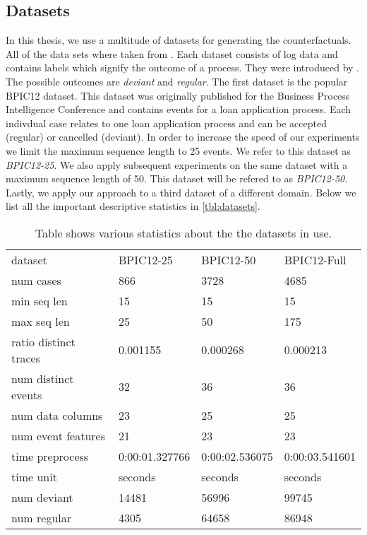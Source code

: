 \documentclass[./../../paper.tex]{subfiles}
\begin{document}
\subsection{Datasets}
\label{sec:dataset_description}
In this thesis, we use a multitude of datasets for generating the counterfactuals. All of the data sets where taken from \citeauthor{teinemaa_OutcomeOrientedPredictiveProcess_2018a}. Each dataset consists of log data and contains labels which signify the outcome of a process. They were introduced by . The possible outcomes are \emph{deviant} and \emph{regular}. The first dataset is the popular BPIC12 dataset. This dataset was originally published for the Business Process Intelligence Conference and contains events for a loan application process. Each indivdual case relates to one loan application process and can be accepted (regular) or cancelled (deviant). In order to increase the speed of our experiments we limit the maximum sequence length to 25 events. We refer to this dataset as \emph{BPIC12-25}. We also apply subsequent experiments on the same dataset with a maximum sequence length of 50. This dataset will be refered to as \emph{BPIC12-50}. Lastly, we apply our approach to a third dataset of a different domain. Below we list all the important descriptive statistics in \autoref{tbl:datasets}.  

\begin{table}[htb]
    \centering
    \begin{tabular}{llll}
        dataset & BPIC12-25 & BPIC12-50 & BPIC12-Full \\
        num cases & 866 & 3728 & 4685 \\
        min seq len & 15 & 15 & 15 \\
        max seq len & 25 & 50 & 175 \\
        ratio distinct traces & 0.001155 & 0.000268 & 0.000213 \\
        num distinct events & 32 & 36 & 36 \\
        num data columns & 23 & 25 & 25 \\
        num event features & 21 & 23 & 23 \\
        time preprocess & 0:00:01.327766 & 0:00:02.536075 & 0:00:03.541601 \\
        time unit & seconds & seconds & seconds \\
        num deviant & 14481 & 56996 & 99745 \\
        num regular & 4305 & 64658 & 86948 \\
        \end{tabular}
    \caption{Table shows various statistics about the the datasets in use.}
    \label{tbl:datasets}
\end{table}
\end{document}
